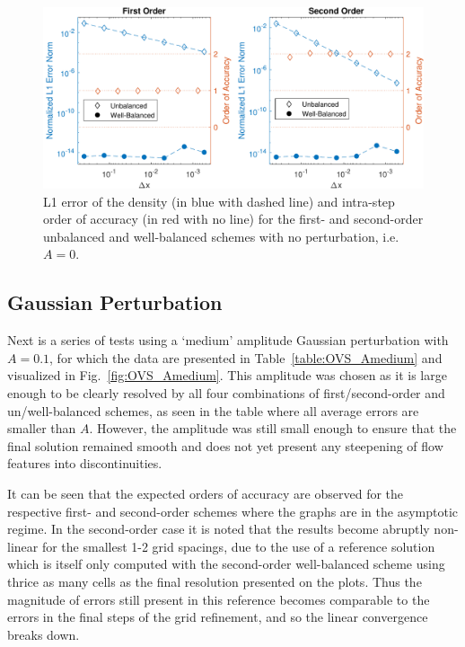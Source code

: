 \begin {figure}
\centering
\includegraphics[width=13cm]{figures/OVSeps0}
\caption {L1 error of the density (in blue with dashed line) and intra-step order of accuracy (in red with no line) for the first- and second-order unbalanced and well-balanced schemes with no perturbation, i.e.\ $A=0$.}
\label{fig:OVS_A0}
\end{figure}

\subsection{Gaussian Perturbation}

Next is a series of tests using a `medium' amplitude Gaussian perturbation with $A=0.1$, for which the data are presented in Table~\ref{table:OVS_Amedium} and visualized in Fig.~\ref{fig:OVS_Amedium}. This amplitude was chosen as it is large enough to be clearly resolved by all four combinations of first/second-order and un/well-balanced schemes, as seen in the table where all average errors are smaller than $A$. However, the amplitude was still small enough to ensure that the final solution remained smooth and does not yet present any steepening of flow features into discontinuities.

It can be seen that the expected orders of accuracy are observed for the respective first- and second-order schemes where the graphs are in the asymptotic regime. In the second-order case it is noted that the results become abruptly non-linear for the smallest 1-2 grid spacings, due to the use of a reference solution which is itself only computed with the second-order well-balanced scheme using thrice as many cells as the final resolution presented on the plots. Thus the magnitude of errors still present in this reference becomes comparable to the errors in the final steps of the grid refinement, and so the linear convergence breaks down.

